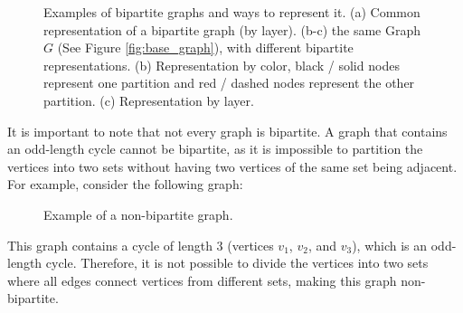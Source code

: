 \begin{figure}[!ht]
\begin{subfigure}{0.3\textwidth}
                \caption{}
                \label{fig:G_bipartite_by_layer}
            \end{subfigure}
            \caption[Examples of bipartite graphs and ways to represent it.]{Examples of bipartite graphs and ways to represent it. (a) Common representation of a bipartite graph (by layer). (b-c) the same Graph $G$ (See Figure \ref{fig:base_graph}), with different bipartite representations. (b) Representation by color, black / solid nodes represent one partition and red / dashed nodes represent the other partition. (c) Representation by layer.}
        \end{figure}

        It is important to note that not every graph is bipartite. A graph that contains an odd-length cycle cannot be bipartite, as it is impossible to partition the vertices into two sets without having two vertices of the same set being adjacent. For example, consider the following graph:
        
        \begin{figure}[!ht]
            \centering
            \caption{Example of a non-bipartite graph.} 
            \label{fig:non_bipartite_graph}
        \end{figure}
        
        This graph contains a cycle of length 3 (vertices \(v_1\), \(v_2\), and \(v_3\)), which is an odd-length cycle. Therefore, it is not possible to divide the vertices into two sets where all edges connect vertices from different sets, making this graph non-bipartite.
        
